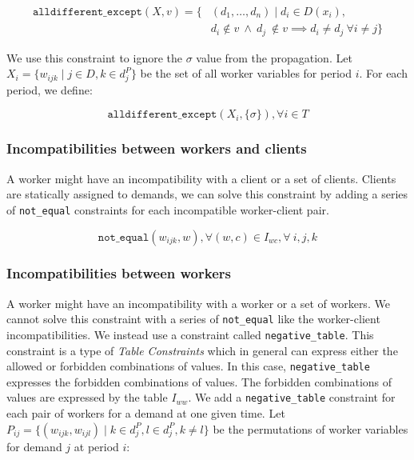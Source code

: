 \documentclass[../../thesis.tex]{subfiles}
\begin{document}
\begin{align*}
   \texttt{alldifferent\_except} (X, v) = \{& (d_1, \dots, d_n) \mid d_i \in D(x_i), \\ 
   & d_i \notin v \ \land \ d_j \ \notin v \implies d_i \neq d_j \ \forall i \neq j \}
\end{align*}

We use this constraint to ignore the $\sigma$ value from the propagation. Let $X_i = \{w_{ijk} \mid j \in D, k \in d_j^P \}$ be the set of all worker variables for period $i$. For each period, we define:

\begin{equation}
  \texttt{alldifferent\_except}(X_i, \{ \sigma \}), \forall i \in T
\end{equation}

\subsubsection{Incompatibilities between workers and clients}

A worker might have an incompatibility with a client or a set of clients. 
Clients are statically assigned to demands, we can solve this constraint by adding 
a series of \texttt{not\_equal} constraints for each incompatible worker-client pair.

\begin{equation}
  \texttt{not\_equal}(w_{ijk}, w), \forall (w, c) \in I_{wc}, \forall \ i, j, k
\end{equation}

\subsubsection{Incompatibilities between workers}

A worker might have an incompatibility with a worker or a set of workers. 
We cannot solve this constraint with a series of \texttt{not\_equal} like the worker-client incompatibilities. We instead use a constraint 
called \texttt{negative\_table}. This constraint is a type of \emph{Table Constraints} \cite{Henteryck:Table} which in general can
express either the allowed or forbidden combinations of values. In this case, \texttt{negative\_table} expresses the forbidden combinations of values.
The forbidden combinations of values are expressed by the table $I_{ww}$. 
We add a \texttt{negative\_table} constraint for each pair of workers for a demand at one given time. Let $P_{ij} = \{ (w_{ijk}, w_{ijl}) \mid k \in d_j^P, l \in d_j^P, k \neq l \}$ 
be the permutations of worker variables for demand $j$ at period $i$:
\end{document}
